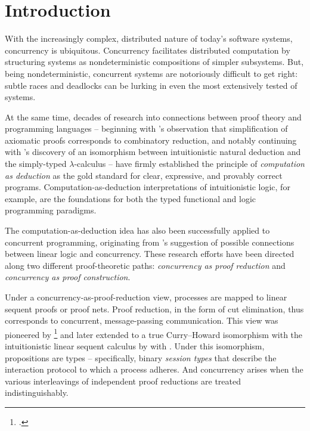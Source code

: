 \chapter{Introduction}\label{ch:introduction}

With the increasingly complex, distributed nature of today's software systems, concurrency is ubiquitous.
Concurrency facilitates distributed computation by structuring systems as nondeterministic compositions of simpler subsystems.
But, being nondeterministic, concurrent systems are notoriously difficult to get right: 
subtle races and deadlocks can be lurking in even the most extensively tested of systems.

At the same time, decades of research into connections between proof theory and programming languages -- beginning with \citeauthor{Curry:PNAS34}'s observation that simplification of axiomatic proofs corresponds to combinatory reduction\autocite{Curry:PNAS34}, and notably continuing with \citeauthor{Howard:69}'s discovery of an isomorphism between intuitionistic natural deduction and the simply-typed $\lambda$-calculus\autocite{Howard:69} -- have firmly established the principle of \emph{computation as deduction} as the gold standard for clear, expressive, and provably correct programs.
Computation-as-deduction interpretations of intuitionistic logic, for example, are the foundations for both the typed functional\autocite{Martin-Lof:LMPS82} and logic\autocites{Miller+:PAL91}{Andreoli:JLC92} programming paradigms.

The computation-as-deduction idea has also been successfully applied to concurrent programming, originating from \citeauthor{Girard:TCS87}'s suggestion of possible connections between linear logic and concurrency\autocite{Girard:TCS87}.
These research efforts have been directed along two different proof-theoretic paths: \emph{concurrency as proof reduction} and \emph{concurrency as proof construction}.


Under a concurrency-as-proof-reduction view, processes are mapped to linear sequent proofs or proof nets.
Proof reduction, in the form of cut elimination, thus corresponds to concurrent, message-passing communication.
This view was pioneered by \citeauthor{Abramsky:TCS93}\footnote{\citeyear{Abramsky:TCS93}.} and later extended to a true Curry--Howard isomorphism with the intuitionistic linear sequent calculus by \citeauthor{Caires+Pfenning:CONCUR10} with \citeauthor{Toninho:CMU15}\autocites{Caires+Pfenning:CONCUR10}{Caires+:TLDI12}{Caires+:MSCS16}.
Under this isomorphism, propositions are types -- specifically, binary \emph{session types}\autocite{Honda:CONCUR93} that describe the interaction protocol to which a process adheres.
And concurrency arises when the various interleavings of independent proof reductions are treated indistinguishably.

